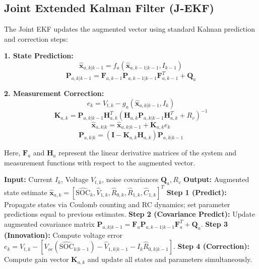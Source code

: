 \subsection{Joint Extended Kalman Filter (J-EKF)}
The Joint EKF updates the augmented vector using standard Kalman prediction and correction steps:

\textbf{1. State Prediction:}
\begin{equation}
\hat{\mathbf{x}}_{a,k|k-1} = f_a(\hat{\mathbf{x}}_{a,k-1|k-1}, I_{k-1})
\end{equation}
\begin{equation}
\mathbf{P}_{a,k|k-1} = \mathbf{F}_{a,k-1} \mathbf{P}_{a,k-1|k-1} \mathbf{F}_{a,k-1}^T + \mathbf{Q}_a
\end{equation}

\textbf{2. Measurement Correction:}
\begin{equation}
e_k = V_{t,k} - g_a(\hat{\mathbf{x}}_{a,k|k-1}, I_k)
\end{equation}
\begin{equation}
\mathbf{K}_{a,k} = \mathbf{P}_{a,k|k-1} \mathbf{H}_{a,k}^T \left( \mathbf{H}_{a,k} \mathbf{P}_{a,k|k-1} \mathbf{H}_{a,k}^T + R_v \right)^{-1}
\end{equation}
\begin{equation}
\hat{\mathbf{x}}_{a,k|k} = \hat{\mathbf{x}}_{a,k|k-1} + \mathbf{K}_{a,k} e_k
\end{equation}
\begin{equation}
\mathbf{P}_{a,k|k} = (\mathbf{I} - \mathbf{K}_{a,k} \mathbf{H}_{a,k}) \mathbf{P}_{a,k|k-1}
\end{equation}

Here, $\mathbf{F}_a$ and $\mathbf{H}_a$ represent the linear derivative matrices of the system and measurement functions with respect to the augmented vector.

\begin{algorithm}[htbp]
\caption{Joint Extended Kalman Filter (J-EKF) Execution Steps}
\label{alg:joint_ekf}
\small
\begin{algorithmic}[1]
\State \textbf{Input:} Current $I_k$, Voltage $V_{t,k}$, noise covariances $\mathbf{Q}_a, R_v$
\State \textbf{Output:} Augmented state estimate $\hat{\mathbf{x}}_{a,k} = [\widehat{\text{SOC}}_k, \hat{V}_{1,k}, \hat{R}_{0,k}, \hat{R}_{1,k}, \hat{C}_{1,k}]^T$
\State \textbf{Step 1 (Predict):} Propagate states via Coulomb counting and RC dynamics; set parameter predictions equal to previous estimates.
\State \textbf{Step 2 (Covariance Predict):} Update augmented covariance matrix $\mathbf{P}_{a,k|k-1} = \mathbf{F}_a \mathbf{P}_{a,k-1|k-1} \mathbf{F}_a^T + \mathbf{Q}_a$.
\State \textbf{Step 3 (Innovation):} Compute voltage error $e_k = V_{t,k} - [V_{oc}(\widehat{\text{SOC}}_{k|k-1}) - \hat{V}_{1,k|k-1} - I_k \hat{R}_{0,k|k-1}]$.
\State \textbf{Step 4 (Correction):} Compute gain vector $\mathbf{K}_{a,k}$ and update all states and parameters simultaneously.
\end{algorithmic}
\end{algorithm}

